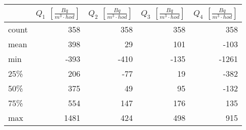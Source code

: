 \begin{tabular}{lrrrr}
\toprule
{} &  $Q_1$ $\left[\si{\frac{Bq}{m^3\cdot hod}}\right]$ &  $Q_2$ $\left[\si{\frac{Bq}{m^3\cdot hod}}\right]$ &  $Q_3$ $\left[\si{\frac{Bq}{m^3\cdot hod}}\right]$ &  $Q_4$ $\left[\si{\frac{Bq}{m^3\cdot hod}}\right]$ \\
\midrule
count &                                                358 &                                                358 &                                                358 &                                                358 \\
    mean  &                                                398 &                                                 29 &                                                101 &                                               -103 \\
    min   &                                               -393 &                                               -410 &                                               -135 &                                              -1261 \\
    25\%   &                                                206 &                                                -77 &                                                 19 &                                               -382 \\
    50\%   &                                                375 &                                                 49 &                                                 95 &                                               -132 \\
75\%   &                                                554 &                                                147 &                                                176 &                                                135 \\
max   &                                               1481 &                                                424 &                                                498 &                                                915 \\
\bottomrule
\end{tabular}
